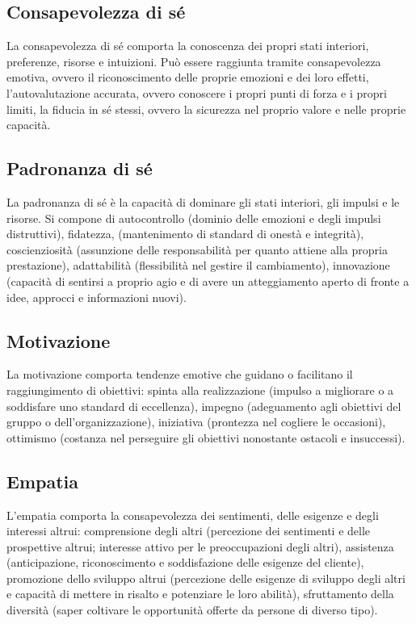 \subsection{Consapevolezza di sé}
La consapevolezza di sé comporta la conoscenza dei propri stati interiori, preferenze, risorse e intuizioni. Può essere raggiunta tramite consapevolezza emotiva, ovvero il riconoscimento delle proprie emozioni e dei loro effetti, l’autovalutazione accurata, ovvero conoscere i propri punti di forza e i propri limiti, la fiducia in sé stessi, ovvero la sicurezza nel proprio valore e nelle proprie capacità.
\subsection{Padronanza di sé}
La padronanza di sé è la capacità di dominare gli stati interiori, gli impulsi e le risorse. Si compone di autocontrollo (dominio delle emozioni e degli impulsi distruttivi), fidatezza, (mantenimento di standard di onestà e integrità), coscienziosità (assunzione delle responsabilità per quanto attiene alla propria prestazione), adattabilità (flessibilità nel gestire il cambiamento), innovazione (capacità di sentirsi a proprio agio e di avere un atteggiamento aperto di fronte a idee, approcci e informazioni nuovi).
\subsection{Motivazione}
La motivazione comporta tendenze emotive che guidano o facilitano il raggiungimento di obiettivi: spinta alla realizzazione (impulso a migliorare o a soddisfare uno standard di eccellenza), impegno (adeguamento agli obiettivi del gruppo o dell’organizzazione), iniziativa (prontezza nel cogliere le occasioni), ottimismo (costanza nel perseguire gli obiettivi nonostante ostacoli e insuccessi).
\subsection{Empatia}
L’empatia comporta la consapevolezza dei sentimenti, delle esigenze e degli interessi altrui: comprensione degli altri (percezione dei sentimenti e delle prospettive altrui; interesse attivo per le preoccupazioni degli altri), assistenza (anticipazione, riconoscimento e soddisfazione delle esigenze del cliente), promozione dello sviluppo altrui (percezione delle esigenze di sviluppo degli altri e capacità di mettere in risalto e potenziare le loro abilità), sfruttamento della diversità (saper coltivare le opportunità offerte da persone di diverso tipo).
